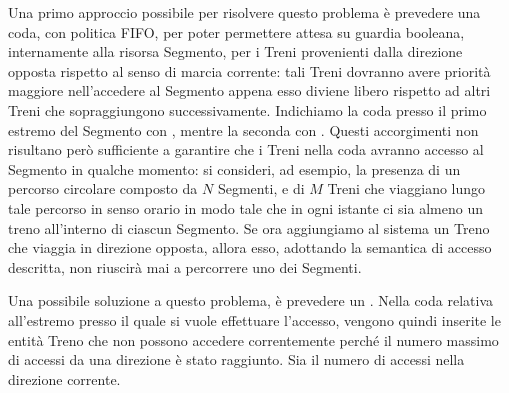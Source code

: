 \begin{description}
			Una primo approccio possibile per risolvere questo problema è prevedere una coda, con politica FIFO, per poter permettere attesa su guardia booleana, internamente alla risorsa Segmento, per i Treni provenienti dalla direzione opposta rispetto al senso di marcia corrente: tali Treni dovranno avere priorità maggiore nell'accedere al Segmento appena esso diviene libero rispetto ad altri Treni che sopraggiungono successivamente. Indichiamo la coda presso il primo estremo del Segmento con , mentre la seconda con .
			Questi accorgimenti non risultano però sufficiente a garantire che i Treni nella coda avranno accesso al Segmento in qualche momento: si consideri, ad esempio, la presenza di un percorso circolare composto da $N$ Segmenti, e di $M$ Treni che viaggiano lungo tale percorso in senso orario in modo tale che in ogni istante ci sia almeno un treno all'interno di ciascun Segmento. Se ora aggiungiamo al sistema un Treno che viaggia in direzione opposta, allora esso, adottando la semantica di accesso descritta, non riuscirà mai a percorrere uno dei Segmenti.			
			
			Una possibile soluzione a questo problema, è prevedere un . Nella coda relativa all'estremo presso il quale si vuole effettuare l'accesso, vengono quindi inserite le entità Treno che non possono accedere correntemente perché il numero massimo di accessi da una direzione è stato raggiunto. 
		Sia  il numero di accessi nella direzione corrente.
		

\end{description}
